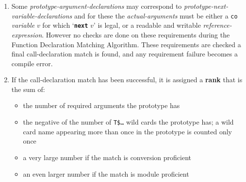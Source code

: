 \documentclass[12pt]{article}
\newcommand{\TT}[1]{{\tt \bfseries #1}}
\newcommand{\key}[1]{{\rm \bfseries #1}}
\begin{document}
\begin{enumerate}
Then if any argument $T'$ is mapped to {\tt *FAIL*} or {\tt *AMBIGUOUS*}
the call-declaration match fails.

If any is mapped to {\tt *EXACT*}, the call-prototype map is
marked as \key{conversion proficient}.  Note that only a single
argument needs to be {\tt *EXACT*} in order for the entire
call-declaration match to be marked conversion proficient.

\item\label{CALL-DECLARATION-NEXT-ARGUMENTS}
Some {\em prototype-argument-declarations} may correspond to
{\em prototype-next-variable-de\-clar\-ations} and for these
the {\em actual-arguments} must be either a {\tt co} {\em variable} $v$
for which `\TT{next} $v$' is legal, or a readable and writable
{\em reference-expression}.  However no checks are done on these
requirements during the Function Declaration Matching Algorithm.
These requirements are checked a final call-declaration
match is found, and any requirement failure becomes a compile error.

\item\label{CALL-DECLARATION-RANK-COMPUTATION}
If the call-declaration match has been successful, it is assigned
a \key{rank} that is the sum of:
\begin{itemize}
\item the number of required arguments the prototype has
\item the negative of the number of {\tt T\$\ldots} wild cards
the prototype has; a wild card name appearing more than once in
the prototype is counted only once
\item a very large number if the match is conversion proficient
\item an even larger number if the match is module proficient
\end{itemize}

\end{enumerate}
\end{document}
